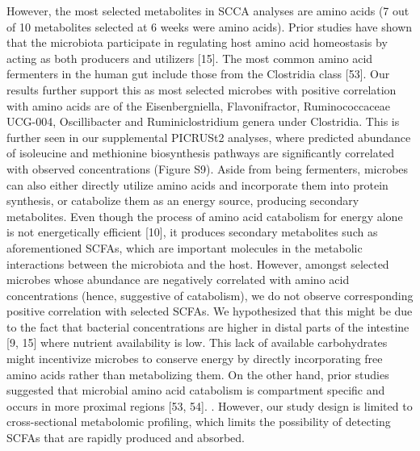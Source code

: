However, the most selected metabolites in SCCA analyses are amino acids (7 out of 10 metabolites selected at 6 weeks were amino acids). Prior studies have shown that the microbiota participate in regulating host amino acid homeostasis by acting as both producers and utilizers [15]. The most common amino acid fermenters in the human gut include those from the Clostridia class [53]. Our results further support this as most selected microbes with positive correlation with amino acids are of the Eisenbergniella, Flavonifractor, Ruminococcaceae UCG-004, Oscillibacter and Ruminiclostridium genera under Clostridia. This is further seen in our supplemental PICRUSt2 analyses, where predicted abundance of isoleucine and methionine biosynthesis pathways are significantly correlated with observed concentrations (Figure S9). 
Aside from being fermenters, microbes can also either directly utilize amino acids and incorporate them into protein synthesis, or catabolize them as an energy source, producing secondary metabolites. Even though the process of amino acid catabolism for energy alone is not energetically efficient [10], it produces secondary metabolites such as aforementioned SCFAs, which are important molecules in the metabolic interactions between the microbiota and the host. However, amongst selected microbes whose abundance are negatively correlated with amino acid concentrations (hence, suggestive of catabolism), we do not observe corresponding positive correlation with selected SCFAs.  We hypothesized that this might be due to the fact that bacterial concentrations are higher in distal parts of the intestine [9, 15] where nutrient availability is low. This lack of available carbohydrates might incentivize microbes to conserve energy by directly incorporating free amino acids rather than metabolizing them. On the other hand, prior studies suggested that microbial amino acid catabolism is compartment specific and occurs in more proximal regions [53, 54]. . However, our study design is limited to cross-sectional metabolomic profiling, which limits the possibility of detecting SCFAs that are rapidly produced and absorbed.  
